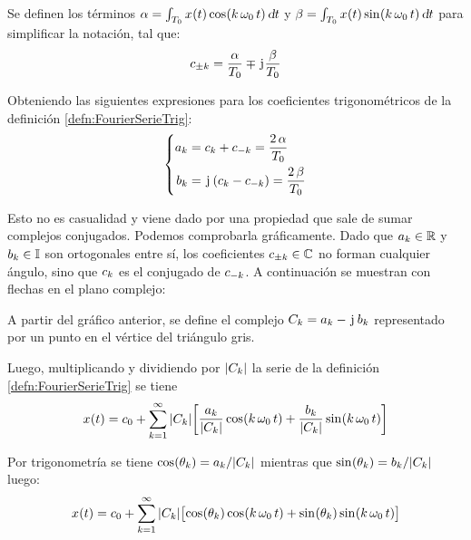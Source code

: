 Se definen los términos $\alpha = \int_{T_0} \fx[x]{t} \fx[\cos]{\kth \, \omega_0 \, t} \dif t$ y $\beta = \int_{T_0} \fx[x]{t} \fx[\sin]{\kth \, \omega_0 \, t} \dif t$ para simplificar la notación, tal que:
\begin{equation*}
     c_{\pm\kth} = \frac{\alpha}{T_0} \mp \iu \frac{\beta}{T_0}
\end{equation*}

Obteniendo las siguientes expresiones para los coeficientes trigonométricos de la definición \ref{defn:FourierSerieTrig}:
\begin{equation*}
    \left\{
    \begin{aligned}
        a_\kth &= c_\kth + c_{-\kth} = \frac{2 \, \alpha}{T_0}
        \\
        b_\kth &= \iu \inParentheses{c_\kth - c_{-\kth}} = \frac{2 \, \beta}{T_0}
    \end{aligned}
    \right.
\end{equation*}

Esto no es casualidad y viene dado por una propiedad que sale de sumar complejos conjugados. Podemos comprobarla gráficamente. Dado que $a_\kth \in \setR$ y $b_\kth \in \setI$ son ortogonales entre sí, los coeficientes $c_{\pm\kth} \in \setC$ no forman cualquier ángulo, sino que $c_\kth$ es el conjugado de $c_{-\kth}$. A continuación se muestran con flechas en el plano complejo:

\begin{center}
    \def\svgwidth{0.6\linewidth}
    
\end{center}

A partir del gráfico anterior, se define el complejo $C_\kth = a_\kth - \iu \, b_\kth$ representado por un punto en el vértice del triángulo gris.

Luego, multiplicando y dividiendo por $\norm{C_\kth}$ la serie de la definición \ref{defn:FourierSerieTrig} se tiene
\begin{equation*}
    \fx[x]{t} = c_0 + \sum_{\kth=1}^{\infty} \norm{C_\kth} \inBrackets{ \dfrac{a_\kth}{\norm{C_\kth}} \fx[\cos]{\kth \, \omega_0 \, t} + \dfrac{b_\kth}{\norm{C_\kth}} \fx[\sin]{\kth \, \omega_0 \, t} }
\end{equation*}

Por trigonometría se tiene $\fx[\cos]{\theta_\kth} = a_\kth / \norm{C_\kth}$ mientras que $\fx[\sin]{\theta_\kth} = b_\kth / \norm{C_\kth}$ luego:
\begin{equation*}
    \fx[x]{t} = c_0 + \sum_{\kth=1}^{\infty} \norm{C_\kth} \inBrackets{ \fx[\cos]{\theta_\kth} \fx[\cos]{\kth \, \omega_0 \, t} + \fx[\sin]{\theta_\kth} \fx[\sin]{\kth \, \omega_0 \, t} }
\end{equation*}

